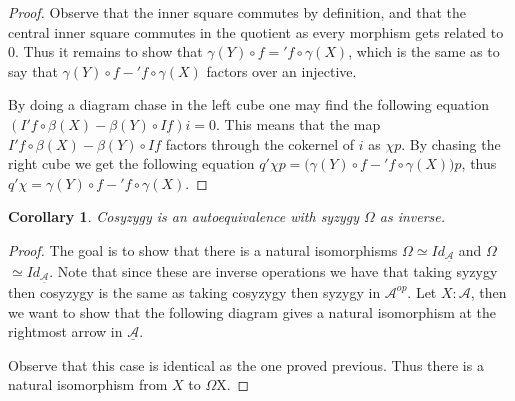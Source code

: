 \documentclass[11pt]{article}
\newtheorem{corollary}{Corollary}[theorem]
\theoremstyle{definition}
\theoremstyle{remark}
\newcommand{\upside}[1]{\rotatebox[origin=c]{180}{#1}}
\begin{document}
\begin{proof}
                Observe that the inner square commutes by definition, and that the central inner square commutes in the quotient as every morphism gets related to $0$. Thus it remains to show that \underline{$\gamma (Y)\circ$$f$}$=$\underline{$'f\circ\gamma (X)$}, which is the same as to say that $\gamma (Y)\circ$$f-$$'f\circ\gamma (X)$ factors over an injective.

                By doing a diagram chase in the left cube one may find the following equation $(I'f\circ \beta(X)-\beta (Y)\circ If)i=0$. This means that the map $I'f\circ \beta(X)-\beta (Y)\circ If$ factors through the cokernel of $i$ as $\chi p$. By chasing the right cube we get the following equation $q'\chi p = (\gamma (Y)\circ$$f-$$'f\circ\gamma (X))p$, thus $q'\chi =$$\gamma (Y)\circ$$f-$$'f\circ\gamma (X)$.
            \end{proof}

            \begin{corollary}
                Cosyzygy \upside{$\Omega$} is an autoequivalence with syzygy $\Omega$ as inverse.
            \end{corollary}

            \begin{proof}
                The goal is to show that there is a natural isomorphisms \underline{$\Omega$\upside{$\Omega$}}$\simeq Id_{\underline{\mathcal{A}}}$ and \underline{\upside{$\Omega$}$\Omega$}$\simeq Id_{\underline{\mathcal{A}}}$. Note that since these are inverse operations we have that taking syzygy then cosyzygy is the same as taking cosyzygy then syzygy in $\mathcal{A}^{op}$.
                Let $X:\mathcal{A}$, then we want to show that the following diagram gives a natural isomorphism at the rightmost arrow in $\underline{\mathcal{A}}$.
                \begin{center}
                \end{center}
                Observe that this case is identical as the one proved previous. Thus there is a natural isomorphism from $X$ to \upside{$\Omega$}$\Omega$X.
            \end{proof}
\end{document}
